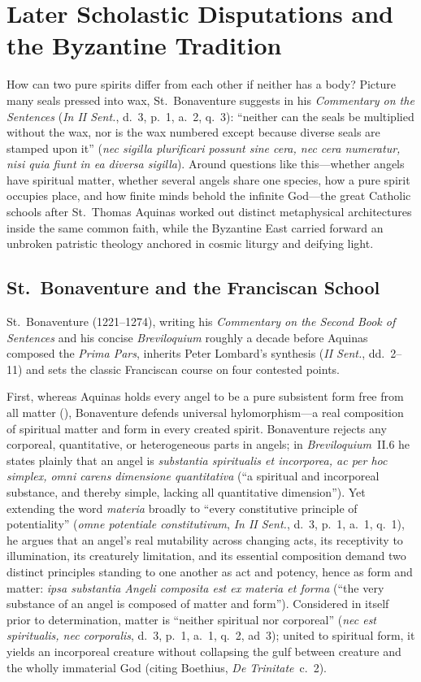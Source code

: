 \section{Later Scholastic Disputations and the Byzantine Tradition}

How can two pure spirits differ from each other if neither has a body? Picture many seals pressed into wax, St.~Bonaventure suggests in his \emph{Commentary on the Sentences} (\emph{In II Sent.}, d.~3, p.~1, a.~2, q.~3): ``neither can the seals be multiplied without the wax, nor is the wax numbered except because diverse seals are stamped upon it'' (\emph{nec sigilla plurificari possunt sine cera, nec cera numeratur, nisi quia fiunt in ea diversa sigilla}). Around questions like this---whether angels have spiritual matter, whether several angels share one species, how a pure spirit occupies place, and how finite minds behold the infinite God---the great Catholic schools after St.~Thomas Aquinas worked out distinct metaphysical architectures inside the same common faith, while the Byzantine East carried forward an unbroken patristic theology anchored in cosmic liturgy and deifying light.

\subsection{St.~Bonaventure and the Franciscan School}

St.~Bonaventure (1221--1274), writing his \emph{Commentary on the Second Book of Sentences} and his concise \emph{Breviloquium} roughly a decade before Aquinas composed the \emph{Prima Pars}, inherits Peter Lombard's synthesis (\emph{II Sent.}, dd.~2--11) and sets the classic Franciscan course on four contested points.

First, whereas Aquinas holds every angel to be a pure subsistent form free from all matter (), Bonaventure defends universal hylomorphism---a real composition of spiritual matter and form in every created spirit. Bonaventure rejects any corporeal, quantitative, or heterogeneous parts in angels; in \emph{Breviloquium}~II.6 he states plainly that an angel is \emph{substantia spiritualis et incorporea, ac per hoc simplex, omni carens dimensione quantitativa} (``a spiritual and incorporeal substance, and thereby simple, lacking all quantitative dimension''). Yet extending the word \emph{materia} broadly to ``every constitutive principle of potentiality'' (\emph{omne potentiale constitutivum}, \emph{In II Sent.}, d.~3, p.~1, a.~1, q.~1), he argues that an angel's real mutability across changing acts, its receptivity to illumination, its creaturely limitation, and its essential composition demand two distinct principles standing to one another as act and potency, hence as form and matter: \emph{ipsa substantia Angeli composita est ex materia et forma} (``the very substance of an angel is composed of matter and form''). Considered in itself prior to determination, matter is ``neither spiritual nor corporeal'' (\emph{nec est spiritualis, nec corporalis}, d.~3, p.~1, a.~1, q.~2, ad~3); united to spiritual form, it yields an incorporeal creature without collapsing the gulf between creature and the wholly immaterial God (citing Boethius, \emph{De Trinitate}~c.~2).

